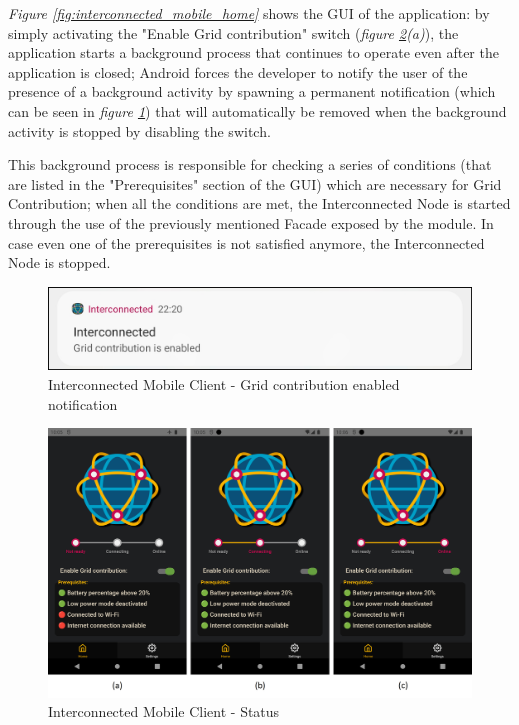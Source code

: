 \textit{Figure \ref{fig:interconnected_mobile_home}} shows the GUI of the application: by simply activating the "Enable Grid contribution" switch (\textit{figure \ref{fig:interconnected_mobile_connection}(a)}), the application starts a background process that continues to operate even after the application is closed; Android forces the developer to notify the user of the presence of a background activity by spawning a permanent notification (which can be seen in \textit{figure \ref{fig:notification_contribution}}) that will automatically be removed when the background activity is stopped by disabling the switch.

This background process is responsible for checking a series of conditions (that are listed in the "Prerequisites" section of the GUI) which are necessary for Grid Contribution; when all the conditions are met, the Interconnected Node is started through the use of the previously mentioned Facade exposed by the module. In case even one of the prerequisites is not satisfied anymore, the Interconnected Node is stopped.

\begin{figure}[!ht]
    \centering
    \includegraphics[scale=0.35]{document/chapters/chapter_7/images/notification_contribution.png}
    \caption{Interconnected Mobile Client - Grid contribution enabled notification}
    \label{fig:notification_contribution}
\end{figure}

\begin{figure}[!ht]
    \centering
    \includegraphics[width=\linewidth]{document/chapters/chapter_7/images/interconnected_mobile_connection.png}
    \caption{Interconnected Mobile Client - Status}
    \label{fig:interconnected_mobile_connection}
\end{figure}

